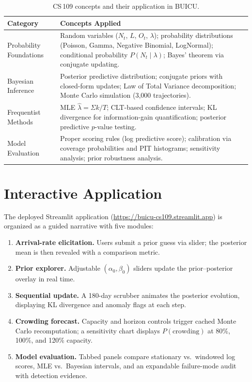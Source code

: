 \documentclass[10pt, twocolumn]{article}
\begin{document}
\begin{table}[H]
\centering
\caption{CS\,109 concepts and their application in BUICU.}\label{tab:concepts}
\renewcommand{\arraystretch}{1.15}
\small
\begin{tabular}{@{}p{3.2cm}p{12cm}@{}}
\toprule
\textbf{Category} & \textbf{Concepts Applied} \\
\midrule
Probability Foundations
  & Random variables ($N_t$, $L$, $O_t$, $\lambda$); probability distributions (Poisson, Gamma, Negative Binomial, LogNormal); conditional probability $P(N_t \mid \lambda)$; Bayes' theorem via conjugate updating. \\
\addlinespace
Bayesian Inference
  & Posterior predictive distribution; conjugate priors with closed-form updates; Law of Total Variance decomposition; Monte Carlo simulation (3{,}000 trajectories). \\
\addlinespace
Frequentist Methods
  & MLE $\hat{\lambda} = \Sigma k / T$; CLT-based confidence intervals; KL divergence for information-gain quantification; posterior predictive $p$-value testing. \\
\addlinespace
Model Evaluation
  & Proper scoring rules (log predictive score); calibration via coverage probabilities and PIT histograms; sensitivity analysis; prior robustness analysis. \\
\bottomrule
\end{tabular}
\end{table}

\section{Interactive Application}\label{app:website}

The deployed Streamlit application (\url{https://buicu-cs109.streamlit.app}) is organized as a guided narrative with five modules:

\begin{enumerate}[leftmargin=2em]
    \item \textbf{Arrival-rate elicitation.} Users submit a prior guess via slider; the posterior mean is then revealed with a comparison metric.
    \item \textbf{Prior explorer.} Adjustable $(\alpha_0, \beta_0)$ sliders update the prior--posterior overlay in real time.
    \item \textbf{Sequential update.} A 180-day scrubber animates the posterior evolution, displaying KL divergence and anomaly flags at each step.
    \item \textbf{Crowding forecast.} Capacity and horizon controls trigger cached Monte Carlo recomputation; a sensitivity chart displays $P(\text{crowding})$ at 80\%, 100\%, and 120\% capacity.
    \item \textbf{Model evaluation.} Tabbed panels compare stationary vs.\ windowed log scores, MLE vs.\ Bayesian intervals, and an expandable failure-mode audit with detection evidence.
\end{enumerate}
\end{document}
